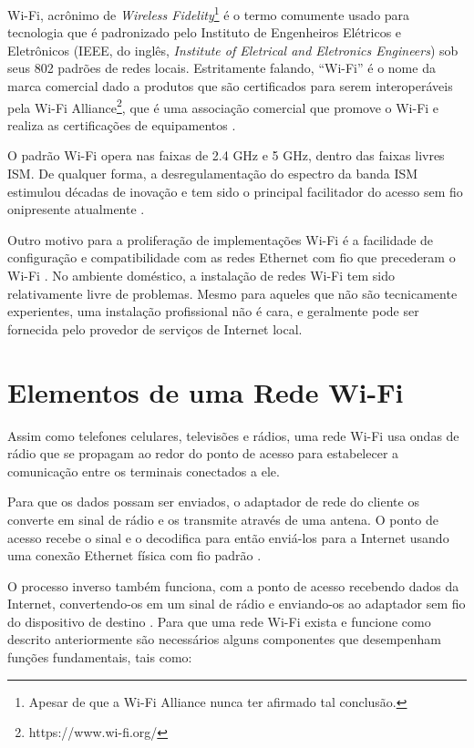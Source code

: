 Wi-Fi, acrônimo de \textit{Wireless Fidelity}\footnote[3]{Apesar de que a Wi-Fi Alliance nunca ter afirmado tal conclusão.} é o termo comumente usado para tecnologia que é padronizado pelo Instituto de Engenheiros Elétricos e Eletrônicos (IEEE, do inglês, \textit{Institute of Eletrical and Eletronics Engineers}) sob seus 802 padrões de redes locais. Estritamente falando, ``Wi-Fi'' é o nome da marca comercial dado a produtos que são certificados para serem interoperáveis pela Wi-Fi Alliance\footnote[4]{https://www.wi-fi.org/}, que é uma associação comercial que promove o Wi-Fi e realiza as certificações de equipamentos \cite{gorshe2014ieee}.

O padrão Wi-Fi opera nas faixas de 2.4 GHz e 5 GHz, dentro das faixas livres ISM. De qualquer forma, a desregulamentação do espectro da banda ISM estimulou décadas de inovação e tem sido o principal facilitador do acesso sem fio onipresente atualmente \cite{gorshe2014ieee}.

Outro motivo para a proliferação de implementações Wi-Fi é a facilidade de configuração e compatibilidade com as redes Ethernet com fio que precederam o Wi-Fi \cite{gorshe2014ieee}. No ambiente doméstico, a instalação de redes Wi-Fi tem sido relativamente livre de problemas. Mesmo para aqueles que não são tecnicamente experientes, uma instalação profissional não é cara, e geralmente pode ser fornecida pelo provedor de serviços de Internet local.

\section{Elementos de uma Rede Wi-Fi}
\label{elementos-rede-wifi}

Assim como telefones celulares, televisões e rádios, uma rede Wi-Fi usa ondas de rádio que se propagam ao redor do ponto de acesso para estabelecer a comunicação entre os terminais conectados a ele.

Para que os dados possam ser enviados, o adaptador de rede do cliente os converte em sinal de rádio e os transmite através de uma antena. O ponto de acesso recebe o sinal e o decodifica para então enviá-los para a Internet usando uma conexão Ethernet física com fio padrão \cite{brain2001}.

O processo inverso também funciona, com a ponto de acesso recebendo dados da Internet, convertendo-os em um sinal de rádio e enviando-os ao adaptador sem fio do dispositivo de destino \cite{brain2001}.
Para que uma rede Wi-Fi exista e funcione como descrito anteriormente são necessários alguns componentes que desempenham funções fundamentais, tais como:

